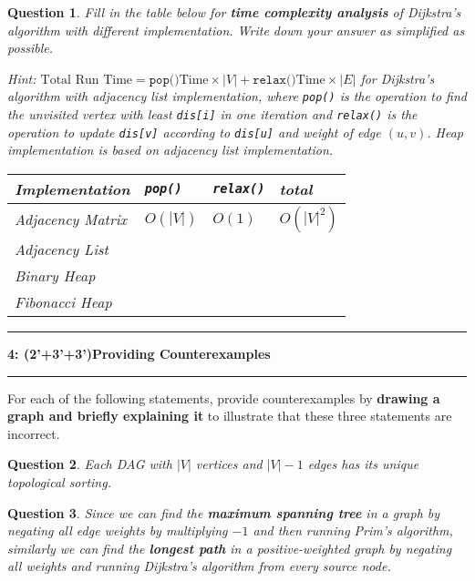 \documentclass[10.5pt]{article}
\newcommand\question[2]{\vspace{.25in}\hrule\textbf{#1: #2}\vspace{.5em}\hrule\vspace{.10in}}
\newtheorem{Q}{Question}
\begin{document}
	\begin{Q}
		Fill in the table below for \textbf{time complexity analysis} of Dijkstra’s algorithm with different implementation. Write down your answer as simplified as possible.
		
		\textit{Hint: $\text{Total Run Time} = \texttt{pop()}\text{Time} \times |V| + \texttt{relax()}\text{Time} \times |E|$ for Dijkstra’s algorithm with adjacency list implementation, where \texttt{pop()} is the operation to find the unvisited vertex with least \texttt{dis[i]} in one iteration and \texttt{relax()} is the operation to update \texttt{dis[v]} according to \texttt{dis[u]} and weight of edge $(u, v)$. Heap implementation is based on adjacency list implementation.}
		\begin{table}[htbp]
			\begin{center}  
				\begin{tabular}{|l|p{3cm}<{\centering}|p{3cm}<{\centering}| p{3cm}<{\centering}|}  
					\hline  
					Implementation & \texttt{pop()} & \texttt{relax()}  & total \\ \hline  
					Adjacency Matrix&$O(|V|)$&$O(1)$& $O(|V|^2)$ \\ \hline
					Adjacency List 	&  		 &  	&  \\ \hline
					Binary Heap 	&  	     &  	& \\ \hline
					Fibonacci Heap 	&  		 &  	& \\ \hline
				\end{tabular}  
			\end{center}  
		\end{table}
	\end{Q}

\pagebreak

\question{4}{(2'+3'+3')Providing Counterexamples}
For each of the following statements, provide counterexamples by \textbf{drawing a graph and briefly explaining it} to illustrate that these three statements are incorrect.
\begin{Q}
	Each DAG with $|V|$ vertices and $|V|-1$ edges has its unique topological sorting.
	\vspace{3.5cm}
\end{Q}

\begin{Q}
	Since we can find the \textbf{maximum spanning tree} in a graph by negating all edge weights by multiplying $-1$ and then running Prim's algorithm, similarly we can find the \textbf{longest path} in a positive-weighted graph by negating all weights and running Dijkstra's algorithm from every source node.
	\vspace{4cm}
\end{Q}
	
\end{document}

